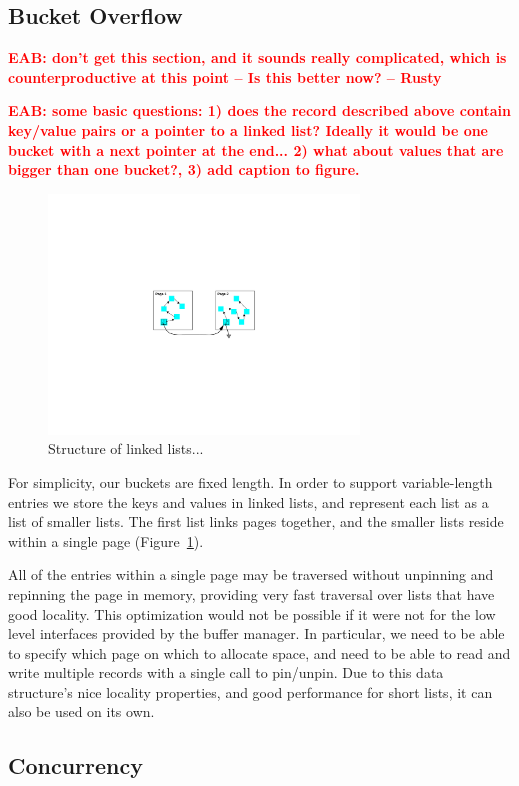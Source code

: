 \documentclass[letterpaper,twocolumn,english]{article}
\newcommand{\eab}[1]{\textcolor{red}{\bf EAB: #1}}
\begin{document}
\subsection{Bucket Overflow}

\eab{don't get this section, and it sounds really complicated, which is counterproductive at this point  -- Is this better now? -- Rusty}

\eab{some basic questions: 1) does the record described above contain
key/value pairs or a pointer to a linked list?  Ideally it would be
one bucket with a next pointer at the end... 2) what about values that
are bigger than one bucket?, 3) add caption to figure.}

\begin{figure}
\includegraphics[width=3.25in]{LHT2.pdf}
\caption{\label{fig:LHT}Structure of linked lists...}
\end{figure}

For simplicity, our buckets are fixed length.  In order to support
variable-length entries we store the keys and values
in linked lists, and represent each list as a list of 
smaller lists.  The first list links pages together, and the smaller
lists reside within a single page (Figure~\ref{fig:LHT}).

All of the entries within a single page may be traversed without
unpinning and repinning the page in memory, providing very fast
traversal over lists that have good locality.  This optimization would
not be possible if it were not for the low level interfaces provided
by the buffer manager.  In particular, we need to be able to specify
which page on which to allocate space, and need to be able to
read and write multiple records with a single call to pin/unpin.  Due to
this data structure's nice locality properties, and good performance
for short lists, it can also be used on its own.

\subsection{Concurrency}
\end{document}
